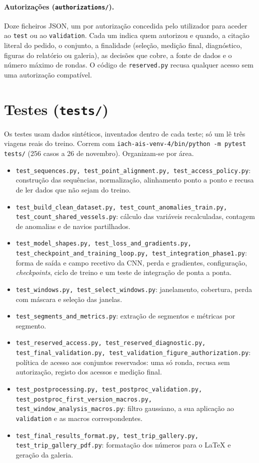 \documentclass[11pt,a4paper]{article}
\newcommand{\f}[1]{\texttt{#1}}
\begin{document}
\paragraph{Autorizações (\f{authorizations/}).} Doze ficheiros JSON, um por autorização concedida
pelo utilizador para aceder ao \f{test} ou ao \f{validation}. Cada um indica quem autorizou e
quando, a citação literal do pedido, o conjunto, a finalidade (seleção, medição final, diagnóstico,
figuras do relatório ou galeria), as decisões que cobre, a fonte de dados e o número máximo de
rondas. O código de \f{reserved.py} recusa qualquer acesso sem uma autorização compatível.

\section{Testes (\f{tests/})}\label{sec:testes}

Os testes usam dados sintéticos, inventados dentro de cada teste; só um lê três viagens reais do
treino. Correm com \f{iach-ais-venv-4/bin/python -m pytest tests/} (256 casos a 26 de novembro).
Organizam-se por área.

\begin{itemize}
\item \texttt{test\_sequences.py, test\_point\_alignment.py, test\_access\_policy.py}: construção das
  sequências, normalização, alinhamento ponto a ponto e recusa de ler dados que não sejam do
  treino.
\item \texttt{test\_build\_clean\_dataset.py, test\_count\_anomalies\_train.py,
  test\_count\_shared\_vessels.py}: cálculo das variáveis recalculadas, contagem de anomalias e de
  navios partilhados.
\item \texttt{test\_model\_shapes.py, test\_loss\_and\_gradients.py,
  test\_checkpoint\_and\_training\_loop.py, test\_integration\_phase1.py}: forma de saída e campo
  recetivo da CNN, perda e gradientes, configuração, \emph{checkpoints}, ciclo de treino e um teste
  de integração de ponta a ponta.
\item \texttt{test\_windows.py, test\_select\_windows.py}: janelamento, cobertura, perda com máscara e
  seleção das janelas.
\item \texttt{test\_segments\_and\_metrics.py}: extração de segmentos e métricas por segmento.
\item \texttt{test\_reserved\_access.py, test\_reserved\_diagnostic.py, test\_final\_validation.py,
  test\_validation\_figure\_authorization.py}: política de acesso aos conjuntos reservados: uma só
  ronda, recusa sem autorização, registo dos acessos e medição final.
\item \texttt{test\_postprocessing.py, test\_postproc\_validation.py,
  test\_postproc\_first\_version\_macros.py, test\_window\_analysis\_macros.py}: filtro gaussiano, a
  sua aplicação ao \f{validation} e as macros correspondentes.
\item \texttt{test\_final\_results\_format.py, test\_trip\_gallery.py, test\_trip\_gallery\_pdf.py}: formatação dos números para o LaTeX e geração da galeria.
\end{itemize}
\end{document}
